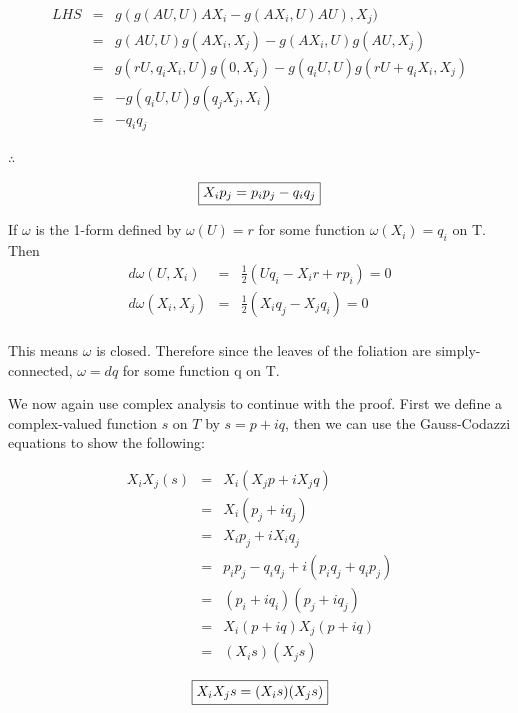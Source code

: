 \begin{eqnarray}
\nonumber
LHS &=& g(g(AU,U)AX_i - g(AX_i,U)AU),X_j) \\
\nonumber
&=& g(AU,U)g(AX_i,X_j)-g(AX_i,U)g(AU,X_j) \\
\nonumber
&=& g(rU,q_iX_i, U)g(0,X_j)-g(q_iU,U)g(rU+q_iX_i, X_j) \\
\nonumber
&=& -g(q_iU,U)g(q_jX_j,X_i) \\
\nonumber
&=& -q_iq_j 
\end{eqnarray}

$\therefore$

\begin{equation}
\framebox{$X_ip_j = p_ip_j - q_iq_j$}
\label{GaussEq}
\end{equation}

If $\omega$ is the 1-form defined by $\omega(U) = r$ for some function $\omega(X_i)=q_i$ on T. Then
\begin{eqnarray}
\nonumber
d\omega(U,X_i)&=&\frac{1}{2}(Uq_i-X_ir+rp_i)=0 \\
\nonumber
d\omega(X_i, X_j)&=&\frac{1}{2}(X_iq_j-X_jq_i)=0 \\
\end{eqnarray}

This means $\omega$ is closed. Therefore since the leaves of the foliation are simply-connected, $\omega = dq$ for some function q on T.

We now again use complex analysis to continue with the proof. First we define a complex-valued function $s$ on $T$ by $s=p+iq$, then we can use the Gauss-Codazzi equations to show the following:

\begin{eqnarray}
\nonumber
X_iX_j(s) &=& X_i(X_jp + iX_jq) \\
\nonumber
&=& X_i(p_j+iq_j)\\
\nonumber
&=& X_ip_j+iX_iq_j \\
\nonumber
&=&p_ip_j-q_iq_j+i(p_iq_j+q_ip_j) \\
\nonumber
&=&(p_i+iq_i)(p_j+iq_j) \\
\nonumber
&=&X_i(p+iq)X_j(p+iq) \\
\nonumber
&=& (X_is)(X_js)
\end{eqnarray}

\begin{equation}
\framebox{$X_iX_js=(X_is)(X_js)$}
\label{X_iX_js}
\end{equation}

